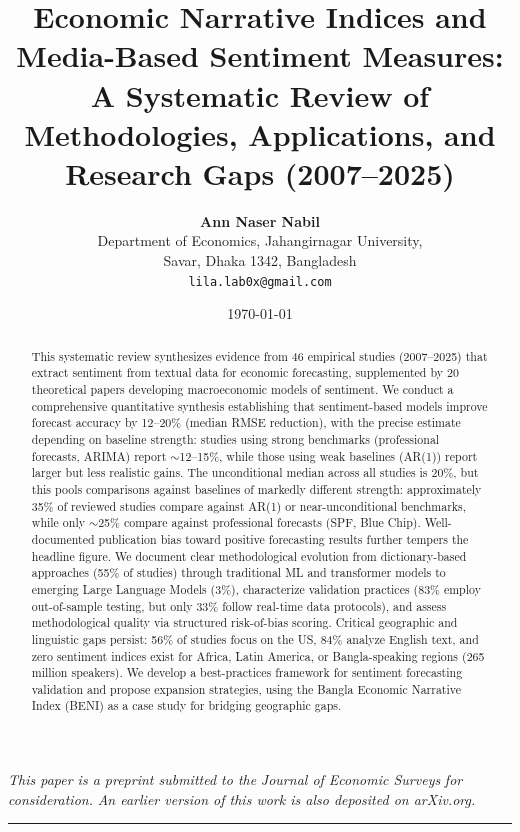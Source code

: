 \documentclass[11pt,twocolumn]{article}
\title{\textbf{Economic Narrative Indices and Media-Based Sentiment Measures:\\
A Systematic Review of Methodologies, Applications, and Research Gaps (2007--2025)}}
\author{\textbf{Ann Naser Nabil}\orcidlink{0009-0006-3561-045X}\\[4pt]
  \small Department of Economics, Jahangirnagar University,\\
  \small Savar, Dhaka 1342, Bangladesh\\
  \small \texttt{lila.lab0x@gmail.com}}
\date{\today}
\begin{document}
\maketitle

\noindent\small\textit{This paper is a preprint submitted to the}
\textit{Journal of Economic Surveys}
\textit{for consideration.}
\textit{An earlier version of this work is also deposited on arXiv.org.}
\par\vspace{0.5em}

\hrule\vspace{1em}

\begin{abstract}
This systematic review synthesizes evidence from 46 empirical studies (2007--2025) that extract sentiment from textual data for economic forecasting, supplemented by 20 theoretical papers developing macroeconomic models of sentiment. We conduct a comprehensive quantitative synthesis establishing that sentiment-based models improve forecast accuracy by 12--20\% (median RMSE reduction), with the precise estimate depending on baseline strength: studies using strong benchmarks (professional forecasts, ARIMA) report $\sim$12--15\%, while those using weak baselines (AR(1)) report larger but less realistic gains. The unconditional median across all studies is 20\%, but this pools comparisons against baselines of markedly different strength: approximately 35\% of reviewed studies compare against AR(1) or near-unconditional benchmarks, while only $\sim$25\% compare against professional forecasts (SPF, Blue Chip). Well-documented publication bias toward positive forecasting results further tempers the headline figure. We document clear methodological evolution from dictionary-based approaches (55\% of studies) through traditional ML and transformer models to emerging Large Language Models (3\%), characterize validation practices (83\% employ out-of-sample testing, but only 33\% follow real-time data protocols), and assess methodological quality via structured risk-of-bias scoring. Critical geographic and linguistic gaps persist: 56\% of studies focus on the US, 84\% analyze English text, and zero sentiment indices exist for Africa, Latin America, or Bangla-speaking regions (265 million speakers). We develop a best-practices framework for sentiment forecasting validation and propose expansion strategies, using the Bangla Economic Narrative Index (BENI) as a case study for bridging geographic gaps.
\end{abstract}
\end{document}
